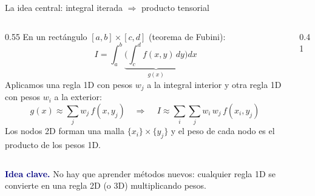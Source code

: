 \documentclass[aspectratio=169,10pt]{beamer}
\newcommand{\ideaclave}[1]{\begin{clave}\small\textbf{\textcolor{navy}{Idea clave.}} #1\end{clave}}
\begin{document}
\begin{frame}{La idea central: integral iterada $\Rightarrow$ producto tensorial}
\begin{columns}[T]
\begin{column}{0.55\textwidth}
\small
En un rect\'angulo $[a,b]\times[c,d]$ (teorema de Fubini):
\[
I=\int_a^b\underbrace{\Big(\int_c^d f(x,y)\,dy\Big)}_{g(x)}dx
\]
Aplicamos una regla 1D con pesos $w_j$ a la integral interior y otra regla 1D con pesos $w_i$ a la exterior:
\[
g(x)\approx\sum_{j} w_j\,f(x,y_j)\quad\Longrightarrow\quad
\boxed{\,I\approx\sum_{i}\sum_{j} w_i\,w_j\,f(x_i,y_j)\,}
\]
Los nodos 2D forman una \alert{malla} $\{x_i\}\times\{y_j\}$ y el peso de cada nodo es el \alert{producto} de los pesos 1D.
\end{column}
\begin{column}{0.41\textwidth}
\centering
{}
\end{column}
\end{columns}
\ideaclave{No hay que aprender m\'etodos nuevos: \alert{cualquier} regla 1D se convierte en una regla 2D (o 3D) multiplicando pesos.}
\end{frame}

\end{document}
